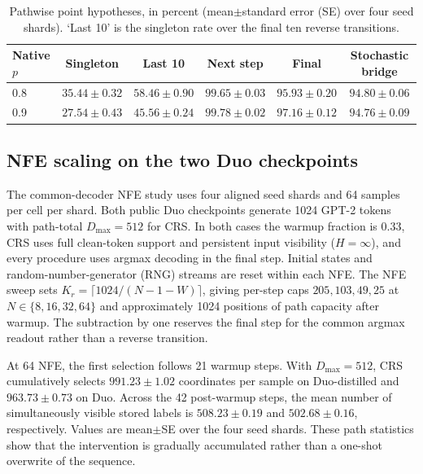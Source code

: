\documentclass{article}
\newcommand{\1}{\mathbf 1}
\theoremstyle{definition}
\begin{document}
\begin{table}[H]
\centering
\small
\setlength{\tabcolsep}{2.8pt}
\begin{tabular}{@{}lccccc@{}}
\toprule
Native $p$ & Singleton & Last 10 & Next step & Final & Stochastic bridge \\
\midrule
0.8 & $35.44\!\pm\!0.32$ & $58.46\!\pm\!0.90$ & $99.65\!\pm\!0.03$ &
$95.93\!\pm\!0.20$ & $94.80\!\pm\!0.06$ \\
0.9 & $27.54\!\pm\!0.43$ & $45.56\!\pm\!0.24$ & $99.78\!\pm\!0.02$ &
$97.16\!\pm\!0.12$ & $94.76\!\pm\!0.09$ \\
\bottomrule
\end{tabular}
\caption{Pathwise point hypotheses, in percent (mean$\pm$standard error (SE)
over four seed
shards). `Last 10' is the singleton rate over the final ten reverse
transitions.}
\label{tab:singleton-trace-app}
\end{table}

\subsection{NFE scaling on the two Duo checkpoints}
\label{app:nfe-scaling}

The common-decoder NFE study uses four aligned seed shards and 64 samples per
cell per shard. Both public Duo checkpoints generate 1024 GPT-2 tokens with
path-total $D_{\max}=512$ for CRS. In both cases the warmup fraction is $0.33$,
CRS uses full clean-token support and persistent input visibility ($H=\infty$), and every
procedure uses argmax decoding in the final step. Initial states and
random-number-generator (RNG) streams
are reset within each NFE. The NFE sweep sets
$K_r=\lceil1024/(N-1-W)\rceil$, giving per-step caps $205,103,49,25$ at
$N\in\{8,16,32,64\}$ and approximately 1024 positions of path capacity after
warmup. The subtraction by one reserves the final step for the
common argmax readout rather than a reverse transition.

At 64 NFE, the first selection follows 21 warmup steps. With
$D_{\max}=512$, CRS cumulatively selects $991.23\pm1.02$ coordinates per sample
on Duo-distilled and $963.73\pm0.73$ on Duo. Across the 42 post-warmup steps,
the mean number of simultaneously visible stored labels is
$508.23\pm0.19$ and $502.68\pm0.16$, respectively. Values are mean$\pm$SE over
the four seed shards. These path statistics show that the intervention is
gradually accumulated rather than a one-shot overwrite of the sequence.
\end{document}

